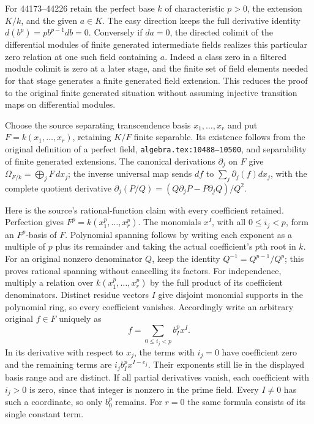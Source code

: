 For 44173--44226 retain the perfect base \(k\) of characteristic \(p>0\), the extension \(K/k\), and the given \(a\in K\). The easy direction keeps the full derivative identity \(d(b^p)=p b^{p-1}db=0\). Conversely if \(da=0\), the directed colimit of the differential modules of finite generated intermediate fields realizes this particular zero relation at one such field containing \(a\). Indeed a class zero in a filtered module colimit is zero at a later stage, and the finite set of field elements needed for that stage generates a finite generated field extension. This reduces the proof to the original finite generated situation without assuming injective transition maps on differential modules.

Choose the source separating transcendence basis \(x_1,\ldots,x_r\) and put \(F=k(x_1,\ldots,x_r)\), retaining \(K/F\) finite separable. Its existence follows from the original definition of a perfect field, \texttt{algebra.tex:10488–10500}, and separability of finite generated extensions. The canonical derivations \(\partial_j\) on \(F\) give \(\Omega_{F/k}=\bigoplus_j F\,dx_j\); the inverse universal map sends \(df\) to \(\sum_j\partial_j(f)dx_j\), with the complete quotient derivative \(\partial_j(P/Q)=(Q\partial_jP-P\partial_jQ)/Q^2\).

Here is the source's rational-function claim with every coefficient retained. Perfection gives \(F^p=k(x_1^p,\ldots,x_r^p)\). The monomials \(x^I\), with all \(0\leq i_j<p\), form an \(F^p\)-basis of \(F\). Polynomial spanning follows by writing each exponent as a multiple of \(p\) plus its remainder and taking the actual coefficient's \(p\)th root in \(k\). For an original nonzero denominator \(Q\), keep the identity \(Q^{-1}=Q^{p-1}/Q^p\); this proves rational spanning without cancelling its factors. For independence, multiply a relation over \(k(x_1^p,\ldots,x_r^p)\) by the full product of its coefficient denominators. Distinct residue vectors \(I\) give disjoint monomial supports in the polynomial ring, so every coefficient vanishes. Accordingly write an arbitrary original \(f\in F\) uniquely as \[
 f=\sum_{0\leq i_j<p} b_I^p x^I.
\] In its derivative with respect to \(x_j\), the terms with \(i_j=0\) have coefficient zero and the remaining terms are \(i_jb_I^p x^{I-e_j}\). Their exponents still lie in the displayed basis range and are distinct. If all partial derivatives vanish, each coefficient with \(i_j>0\) is zero, since that integer is nonzero in the prime field. Every \(I\ne0\) has such a coordinate, so only \(b_0^p\) remains. For \(r=0\) the same formula consists of its single constant term.

